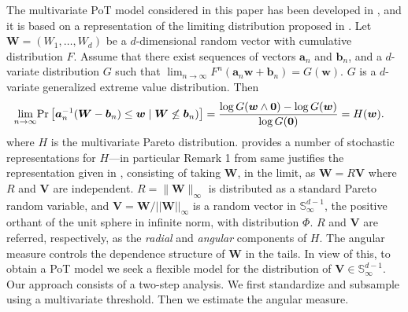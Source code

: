 The multivariate PoT model considered in this paper has been developed in 
    \cite{trubey:pg}, and it is based on a representation of the limiting 
    distribution proposed in \cite{RoSeWa2018a}.  Let 
    $\bm{W} = (W_1, \ldots ,W_d)$ be a $d$-dimensional random vector with
    cumulative distribution $F$. Assume 
    that there exist sequences of vectors $\bm{a}_n$ and $\bm{b}_n$,
    and a $d$-variate distribution $G$ such that 
    $\lim_{n\rightarrow\infty} F^n(\bm{a}_n \bm{w} + \bm{b}_n) = 
    G(\bm{w})$. $G$ is a $d$-variate generalized extreme value 
    distribution. Then
    \begin{equation*}
        \begin{aligned}
            \lim\limits_{n\rightarrow\infty} 
                &\text{Pr}\left[\bm{a}^{-1}_n (\bm{W} - \bm{b}_n) 
                \leq \bm{w} \mid \bm{W} \not\leq \bm{b}_n)\right]  
                = \frac{\log G(\bm{w} \wedge \bm{0}) 
                - \log G(\bm{w}) }{\log G(\bm{0})} = H(\bm{w}).
        \end{aligned}
    \end{equation*}
    where $H$ is the multivariate Pareto distribution. \cite{RoSeWa2018a}
    provides a number of stochastic representations for $H$---in particular
    Remark 1 from same justifies the representation given in \cite{ferreira2014},
    consisting of taking $\bm{W}$, in the limit, as $\bm{W} = R\bm{V}$ 
    where $R$ and $\bm{V}$ are independent. $R = \lVert\bm{W}\rVert_\infty$ is 
    distributed as a standard Pareto random variable, and
    $\bm{V} = \bm{W}/||\bm{W}||_\infty$ is a random vector in  
    $\mathbb{S}_{\infty}^{d-1}$, the positive orthant of the 
    unit  sphere in infinite norm, with distribution $\Phi$. 
    $R$ and $\bm{V}$ are referred, respectively, as the {\em radial} 
    and {\em angular}  components of $H$. The angular measure controls 
    the dependence  structure of $\bm{W}$  in the tails. In view of 
    this, to obtain a  PoT model we seek a flexible model for the 
    distribution of $\bm{V} \in {\mathbb S}_{\infty}^{d-1}$. Our approach
    consists of a two-step analysis. We first standardize and subsample using
    a multivariate threshold. Then we estimate the angular measure.

